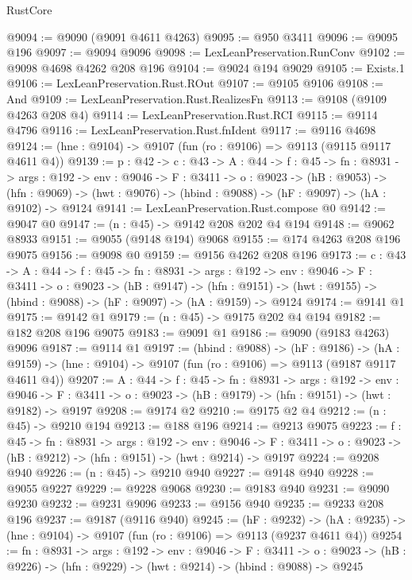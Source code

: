 \begin{lexlean}{RustCore}
\begin{coremodule}
@9094 := @9090 (@9091 @4611 @4263)
@9095 := @950 @3411
@9096 := @9095 @196
@9097 := @9094 @9096
@9098 := LexLeanPreservation.RunConv
@9102 := @9098 @4698 @4262 @208 @196
@9104 := @9024 @194 @9029
@9105 := Exists.{1}
@9106 := LexLeanPreservation.Rust.ROut
@9107 := @9105 @9106
@9108 := And
@9109 := LexLeanPreservation.Rust.RealizesFn
@9113 := @9108 (@9109 @4263 @208 @4)
@9114 := LexLeanPreservation.Rust.RCI
@9115 := @9114 @4796
@9116 := LexLeanPreservation.Rust.fnIdent
@9117 := @9116 @4698
@9124 := (hne : @9104) -> @9107 (fun (ro : @9106) => @9113 (@9115 @9117 @4611 @4))
@9139 := {p : @42} ->
  {c : @43} ->
  {A : @44} ->
  {f : @45} ->
  {fn : @8931} ->
  {args : @192} ->
  {env : @9046} ->
  {F : @3411} ->
  {o : @9023} ->
  (hB : @9053) ->
  (hfn : @9069) -> (hwt : @9076) -> (hbind : @9088) -> (hF : @9097) -> (hA : @9102) -> @9124
@9141 := LexLeanPreservation.Rust.compose @0
@9142 := @9047 @0
@9147 := (n : @45) -> @9142 @208 @202 @4 @194
@9148 := @9062 @8933
@9151 := @9055 (@9148 @194) @9068
@9155 := @174 @4263 @208 @196 @9075
@9156 := @9098 @0
@9159 := @9156 @4262 @208 @196
@9173 := {c : @43} ->
  {A : @44} ->
  {f : @45} ->
  {fn : @8931} ->
  {args : @192} ->
  {env : @9046} ->
  {F : @3411} ->
  {o : @9023} ->
  (hB : @9147) ->
  (hfn : @9151) -> (hwt : @9155) -> (hbind : @9088) -> (hF : @9097) -> (hA : @9159) -> @9124
@9174 := @9141 @1
@9175 := @9142 @1
@9179 := (n : @45) -> @9175 @202 @4 @194
@9182 := @182 @208 @196 @9075
@9183 := @9091 @1
@9186 := @9090 (@9183 @4263) @9096
@9187 := @9114 @1
@9197 := (hbind : @9088) ->
  (hF : @9186) ->
  (hA : @9159) -> (hne : @9104) -> @9107 (fun (ro : @9106) => @9113 (@9187 @9117 @4611 @4))
@9207 := {A : @44} ->
  {f : @45} ->
  {fn : @8931} ->
  {args : @192} ->
  {env : @9046} ->
  {F : @3411} -> {o : @9023} -> (hB : @9179) -> (hfn : @9151) -> (hwt : @9182) -> @9197
@9208 := @9174 @2
@9210 := @9175 @2 @4
@9212 := (n : @45) -> @9210 @194
@9213 := @188 @196
@9214 := @9213 @9075
@9223 := {f : @45} ->
  {fn : @8931} ->
  {args : @192} ->
  {env : @9046} ->
  {F : @3411} -> {o : @9023} -> (hB : @9212) -> (hfn : @9151) -> (hwt : @9214) -> @9197
@9224 := @9208 @940
@9226 := (n : @45) -> @9210 @940
@9227 := @9148 @940
@9228 := @9055 @9227
@9229 := @9228 @9068
@9230 := @9183 @940
@9231 := @9090 @9230
@9232 := @9231 @9096
@9233 := @9156 @940
@9235 := @9233 @208 @196
@9237 := @9187 (@9116 @940)
@9245 := (hF : @9232) ->
  (hA : @9235) -> (hne : @9104) -> @9107 (fun (ro : @9106) => @9113 (@9237 @4611 @4))
@9254 := {fn : @8931} ->
  {args : @192} ->
  {env : @9046} ->
  {F : @3411} ->
  {o : @9023} -> (hB : @9226) -> (hfn : @9229) -> (hwt : @9214) -> (hbind : @9088) -> @9245

\end{coremodule}
\end{lexlean}
